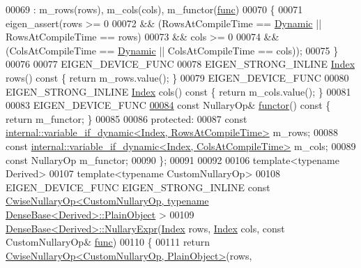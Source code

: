 \begin{DoxyCode}
00069       : m\_rows(rows), m\_cols(cols), m\_functor(\hyperlink{structfunc}{func})
00070     \{
00071       eigen\_assert(rows >= 0
00072             && (RowsAtCompileTime == \hyperlink{namespace_eigen_ad81fa7195215a0ce30017dfac309f0b2}{Dynamic} || RowsAtCompileTime == rows)
00073             &&  cols >= 0
00074             && (ColsAtCompileTime == \hyperlink{namespace_eigen_ad81fa7195215a0ce30017dfac309f0b2}{Dynamic} || ColsAtCompileTime == cols));
00075     \}
00076 
00077     EIGEN\_DEVICE\_FUNC
00078     EIGEN\_STRONG\_INLINE \hyperlink{namespace_eigen_a62e77e0933482dafde8fe197d9a2cfde}{Index} rows()\textcolor{keyword}{ const }\{ \textcolor{keywordflow}{return} m\_rows.value(); \}
00079     EIGEN\_DEVICE\_FUNC
00080     EIGEN\_STRONG\_INLINE \hyperlink{namespace_eigen_a62e77e0933482dafde8fe197d9a2cfde}{Index} cols()\textcolor{keyword}{ const }\{ \textcolor{keywordflow}{return} m\_cols.value(); \}
00081 
00083     EIGEN\_DEVICE\_FUNC
\hyperlink{group___core___module_abef8b2e7bcbcfa98c49caf0a1391ee47}{00084}     \textcolor{keyword}{const} NullaryOp& \hyperlink{group___core___module_abef8b2e7bcbcfa98c49caf0a1391ee47}{functor}()\textcolor{keyword}{ const }\{ \textcolor{keywordflow}{return} m\_functor; \}
00085 
00086   \textcolor{keyword}{protected}:
00087     \textcolor{keyword}{const} \hyperlink{class_eigen_1_1internal_1_1variable__if__dynamic}{internal::variable\_if\_dynamic<Index, RowsAtCompileTime>}
       m\_rows;
00088     \textcolor{keyword}{const} \hyperlink{class_eigen_1_1internal_1_1variable__if__dynamic}{internal::variable\_if\_dynamic<Index, ColsAtCompileTime>}
       m\_cols;
00089     \textcolor{keyword}{const} NullaryOp m\_functor;
00090 \};
00091 
00092 
00106 \textcolor{keyword}{template}<\textcolor{keyword}{typename} Derived>
00107 \textcolor{keyword}{template}<\textcolor{keyword}{typename} CustomNullaryOp>
00108 EIGEN\_DEVICE\_FUNC EIGEN\_STRONG\_INLINE \textcolor{keyword}{const} 
      \hyperlink{group___core___module_class_eigen_1_1_cwise_nullary_op}{CwiseNullaryOp<CustomNullaryOp, typename DenseBase<Derived>::PlainObject}
      >
00109 \hyperlink{group___core___module_class_eigen_1_1_dense_base}{DenseBase<Derived>::NullaryExpr}(\hyperlink{namespace_eigen_a62e77e0933482dafde8fe197d9a2cfde}{Index} rows, 
      \hyperlink{namespace_eigen_a62e77e0933482dafde8fe197d9a2cfde}{Index} cols, \textcolor{keyword}{const} CustomNullaryOp& \hyperlink{structfunc}{func})
00110 \{
00111   \textcolor{keywordflow}{return} \hyperlink{group___core___module_class_eigen_1_1_cwise_nullary_op}{CwiseNullaryOp<CustomNullaryOp, PlainObject>}(rows, 

\end{DoxyCode}
